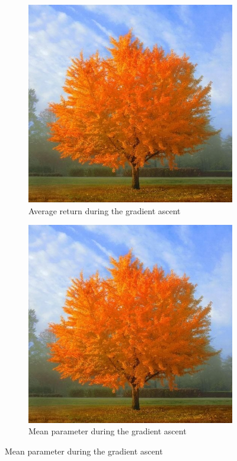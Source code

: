 \documentclass[a4paper, 11pt]{scrartcl}
\begin{document}
 
\begin{figure}[h]
\centering
\begin{subfigure}{.5\textwidth}
  \centering
  \includegraphics[width=\linewidth]{tree.jpg}
  \caption{Average return during the gradient ascent}
  \label{fig:sub3}
\end{subfigure}%
\begin{subfigure}{.5\textwidth}
  \centering
  \includegraphics[width=\linewidth]{tree.jpg}
  \caption{Mean parameter during the gradient ascent}
  \label{fig:sub4}
\end{subfigure}%
\end{figure}
\end{document}
